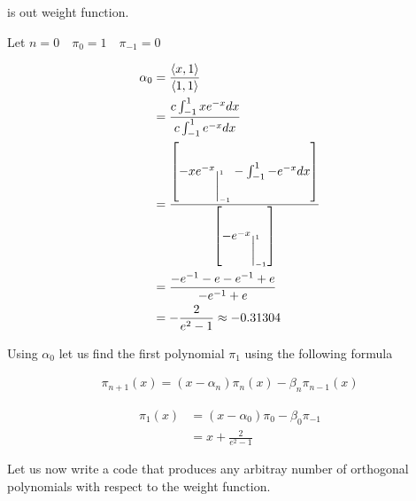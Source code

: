 \documentclass[
]{article}
\begin{document}
is out weight function.

Let \(n = 0 \quad \pi_0 = 1 \quad \pi_{-1} = 0\)

\begin{align}
\alpha_0 &= \frac{\langle x , 1 \rangle}{\langle 1, 1 \rangle} \\
&= \frac{c \int_{-1}^{1}x e^{-x}dx}{c \int_{-1}^{1}e^{-x}dx} \\
&= \frac{\left[{-x e^{-x}}_{\bigg{\vert}_{-1}^{1}} - \int_{-1}^{1}-e^{-x}dx\right]}{\left[{-e^{-x}}_{\bigg{\vert}_{-1}^{1}}\right] } \\
&= \frac{-e^{-1} - e - e^{-1} + e}{-e^{-1} + e} \\
&= -\frac{2}{e^2 - 1} \approx -0.31304
\end{align}

Using \(\alpha_0\) let us find the first polynomial \(\pi_1\) using the
following formula

\begin{align}
\pi_{n+1}(x) = (x - \alpha_n)\pi_n(x) - \beta_n \pi_{n-1}(x)
\end{align}

\begin{align}
\pi_1(x) &= (x - \alpha_0)\pi_0 - \beta_0 \pi_{-1} \\
&= x + \frac{2}{e^2 - 1}
\end{align}

Let us now write a code that produces any arbitray number of orthogonal
polynomials with respect to the weight function.
\end{document}
